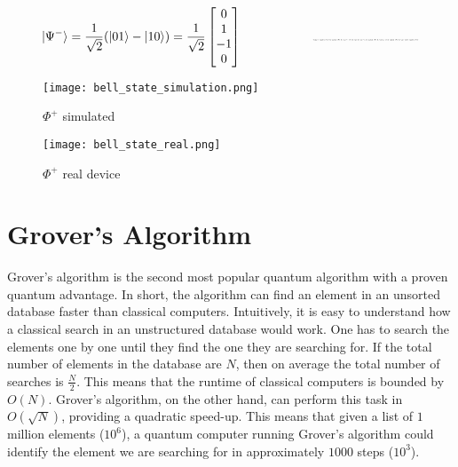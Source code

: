 \documentclass[12pt,a4paper]{report}
\begin{document}
\[ 
|\Psi^-\rangle = \frac{1}{\sqrt{2}}(|01\rangle - |10\rangle) = \frac{1}{\sqrt{2}}\begin{bmatrix}
    0 \\
    1 \\
    -1 \\
    0
\end{bmatrix}
\hspace{2cm}
\resizebox{0.25\textwidth}{!}{
    \begin{quantikz}
       & \gate{H} & \ctrl{1} & \qw & \qw  \\
       & \gate{X} & \targ{} & \gate{Z} & \qw
    \end{quantikz}
}
\]

\begin{figure}[H]
    \centering
    \begin{minipage}{0.45\textwidth}
        \centering
        \texttt{[image: bell\_state\_simulation.png]}
        \caption{\( \Phi^{+} \) simulated}
        \label{fig:img1_bellstate_sim}
    \end{minipage}\hfill
    \begin{minipage}{0.45\textwidth}
        \centering
        \texttt{[image: bell\_state\_real.png]}
        \caption{\( \Phi^{+} \) real device}
        \label{fig:img2_bellstate_real}
    \end{minipage}
\end{figure}

\newpage

\section{Grover's Algorithm}

Grover's algorithm is the second most popular quantum algorithm with a proven quantum advantage. In short, the algorithm can find an element in an unsorted database faster than classical computers. Intuitively, it is easy to understand how a classical search in an unstructured database would work. One has to search the elements one by one until they find the one they are searching for. If the total number of elements in the database are \(N\), then on average the total number of searches is \( \frac{N}{2} \). This means that the runtime of classical computers is bounded by \(O(N)\). Grover's algorithm, on the other hand, can perform this task in \(O(\sqrt{N})\), providing a quadratic speed-up. This means that given a list of \(1\) million elements (\(10^6\)), a quantum computer running Grover's algorithm could identify the element we are searching for in approximately \(1000\) steps (\(10^3\)).
\\
\end{document}
